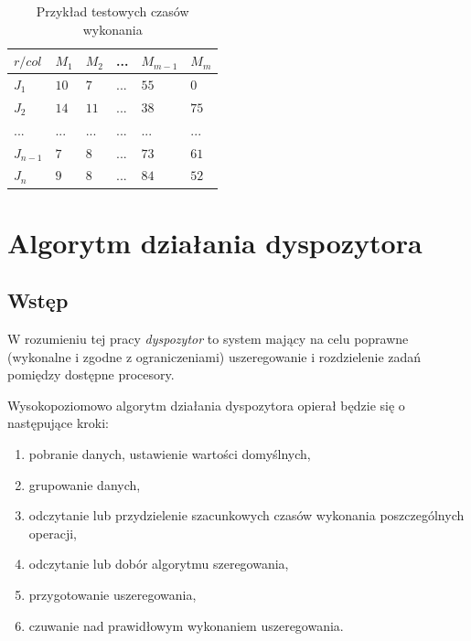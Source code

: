 \documentclass[brudnopis]{xmgr}
\begin{document}
\begin{table}[!tbh]
\begin{tabular}{|l|l|l|l|l|l|} \hline
$r / col$   & $M_1$     & $M_2$     & ...   & $M_{m-1}$ & $M_{m}$   \\ \hline
$J_1$       & $10$      & $7$       & ...   & $55$      & $0$       \\ \hline
$J_2$       & $14$      & $11$      & ...   & $38$      & $75$      \\ \hline
$...$       & $...$     & $...$     & $...$ & $...$     & $...$     \\ \hline
$J_{n-1}$   & $7$       & $8$       & ...   & $73$      & $61$      \\ \hline
$J_{n}$     & $9$       & $8$       & ...   & $84$      & $52$      \\ \hline
\end{tabular}
\caption{Przykład testowych czasów wykonania\label{tab:example-test_times}}
\end{table}


\chapter{Algorytm działania dyspozytora}


\section{Wstęp}

W rozumieniu tej pracy \emph{dyspozytor} to system mający na celu poprawne (wykonalne i zgodne z ograniczeniami) uszeregowanie i rozdzielenie zadań pomiędzy dostępne procesory.
\medskip

Wysokopoziomowo algorytm działania dyspozytora opierał będzie się o następujące kroki:
\begin{enumerate}
    \item pobranie danych, ustawienie wartości domyślnych,
    \item grupowanie danych,
    \item odczytanie lub przydzielenie szacunkowych czasów wykonania poszczególnych operacji,
    \item odczytanie lub dobór algorytmu szeregowania,
    \item przygotowanie uszeregowania,
    \item czuwanie nad prawidłowym wykonaniem uszeregowania.
\end{enumerate}
\end{document}
